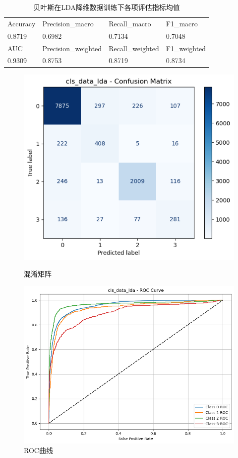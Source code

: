 \documentclass[10pt]{article}
\begin{document}
\begin{table}[H]
  \centering
  \caption{贝叶斯在LDA降维数据训练下各项评估指标均值}
  \begin{tabular}{llll}
  \toprule
  Accuracy & Precision\_macro & Recall\_macro & F1\_macro \\
  0.8719 & 0.6982 & 0.7134 & 0.7048 \\
  \midrule
  AUC & Precision\_weighted & Recall\_weighted & F1\_weighted \\
  0.9309 & 0.8753 & 0.8719 & 0.8734 \\
  \bottomrule
  \end{tabular}
\end{table}

\begin{figure}[H]
\centering
\begin{minipage}[t]{0.45\textwidth}
  \centering
  \includegraphics[width=\linewidth]{cls_nb_lda1.png}
  \caption{混淆矩阵}
  \label{fig:55}
\end{minipage}
\hfill
\begin{minipage}[t]{0.52\textwidth}
  \centering
  \includegraphics[width=\linewidth]{cls_nb_lda2.png}
  \caption{ROC曲线}
  \label{fig:56}
\end{minipage}
\end{figure}
\end{document}
